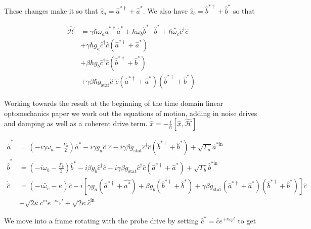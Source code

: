 \documentclass[12pt]{article}
\begin{document}
These changes make it so that $\hat{z}_a = \hat{a}^{*\dag}+\hat{a}^*$. We also have $\hat{z}_b = \hat{b}^{*\dag} + \hat{b}^*$ so that

\begin{align}
\widehat{\mathcal{H}} &= \gamma \hbar \omega_a \hat{a}^{*\dag} \hat{a}^* + \hbar \omega_b \hat{b}^{*\dag}\hat{b}^* + \hbar \tilde{\omega_c} \hat{c}^{\dag} \hat{c} \\
&+\gamma\hbar g_a \hat{c}^{\dag}\hat{c}(\hat{a}^{*\dag}+\hat{a}^*)\\
&+\beta\hbar g_b \hat{c}^{\dag}\hat{c}(\hat{b}^{*\dag}+\hat{b}^*)\\
&+\gamma \beta \hbar g_{\text{stat}} \hat{c}^{\dag}\hat{c} (\hat{a}^{*\dag}+\hat{a}^*)(\hat{b}^{*\dag}+\hat{b}^*)
\end{align}

Working towards the result at the beginning of the time domain linear optomechanics paper we work out the equations of motion, adding in noise drives and damping as well as a coherent drive term. $\dot{\hat{x}} = -\frac{i}{\hbar}[\hat{x},\hat{\mathcal{H}}]$

\begin{align}
\dot{\hat{a}}^* &= \left(-i \gamma \omega_a-\frac{\Gamma_a}{2}\right)\hat{a}^* - i \gamma g_a \hat{c}^{\dag}\hat{c} - i \gamma \beta g_{\text{stat}} \hat{c}^{\dag}\hat{c}(\hat{b}^{*\dag}+\hat{b}^*) + \sqrt{\Gamma_a}\hat{a}^{*\text{in}}\\
\dot{\hat{b}}^* &= \left(-i \omega_b - \frac{\Gamma_b}{2}\right)\hat{b}^* - i \beta g_b \hat{c}^{\dag}\hat{c} - i \gamma \beta g_{\text{stat}} \hat{c}^{\dag}\hat{c}(\hat{a}^{*\dag}+\hat{a}^*) + \sqrt{\Gamma_b}\hat{b}^{*\text{in}}\\
\dot{\hat{c}} &= \left(-i \tilde{\omega_c} -\kappa\right)\hat{c} - i\left[ \gamma g_a (\hat{a}^{*\dag}+\hat{a^*})+ \beta g_b (\hat{b}^{*\dag} + \hat{b}^*)+\gamma \beta g_{\text{stat}}(\hat{a}^{*\dag}+\hat{a}^*)(\hat{b}^{*\dag}+\hat{b}^*)\right]\hat{c}\\
&+\sqrt{2\kappa}\bar{c}^{\text{in}}e^{-i\omega_p t} + \sqrt{2\kappa}\hat{c}^{\text{in}}
\end{align}

We move into a frame rotating with the probe drive by setting $\hat{c}^* = \hat{c}e^{+i\omega_p t}$ to get 
\end{document}
